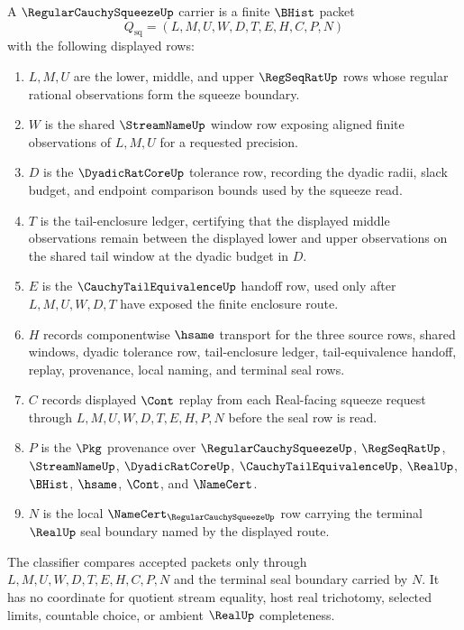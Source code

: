 \begin{definition}
\label{def:regular-cauchy-squeeze-carrier}
A $\RegularCauchySqueezeUp$ carrier is a finite $\BHist$ packet
$$
Q_{\mathrm{sq}}=(L,M,U,W,D,T,E,H,C,P,N)
$$
with the following displayed rows:
\begin{enumerate}
\item $L,M,U$ are the lower, middle, and upper $\RegSeqRatUp$ rows whose regular rational observations form the squeeze boundary.
\item $W$ is the shared $\StreamNameUp$ window row exposing aligned finite observations of $L,M,U$ for a requested precision.
\item $D$ is the $\DyadicRatCoreUp$ tolerance row, recording the dyadic radii, slack budget, and endpoint comparison bounds used by the squeeze read.
\item $T$ is the tail-enclosure ledger, certifying that the displayed middle observations remain between the displayed lower and upper observations on the shared tail window at the dyadic budget in $D$.
\item $E$ is the $\CauchyTailEquivalenceUp$ handoff row, used only after $L,M,U,W,D,T$ have exposed the finite enclosure route.
\item $H$ records componentwise $\hsame$ transport for the three source rows, shared windows, dyadic tolerance row, tail-enclosure ledger, tail-equivalence handoff, replay, provenance, local naming, and terminal seal rows.
\item $C$ records displayed $\Cont$ replay from each Real-facing squeeze request through $L,M,U,W,D,T,E,H,P,N$ before the seal row is read.
\item $P$ is the $\Pkg$ provenance over $\RegularCauchySqueezeUp$, $\RegSeqRatUp$, $\StreamNameUp$, $\DyadicRatCoreUp$, $\CauchyTailEquivalenceUp$, $\RealUp$, $\BHist$, $\hsame$, $\Cont$, and $\NameCert$.
\item $N$ is the local $\NameCert_{\RegularCauchySqueezeUp}$ row carrying the terminal $\RealUp$ seal boundary named by the displayed route.
\end{enumerate}
The classifier compares accepted packets only through $L,M,U,W,D,T,E,H,C,P,N$ and the terminal seal boundary carried by $N$. It has no coordinate for quotient stream equality, host real trichotomy, selected limits, countable choice, or ambient $\RealUp$ completeness.
\end{definition}

